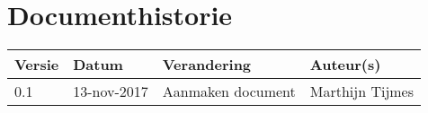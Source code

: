 \section{Documenthistorie}

\begin{tabularx}{\textwidth}{| l | l | X | l |}
	\hline
	\textbf{Versie} & \textbf{Datum} & \textbf{Verandering} & \textbf{Auteur(s)} \\ \hline
	0.1	& 13-nov-2017 & Aanmaken document & Marthijn Tijmes \\ \hline
	\hline

\end{tabularx}
